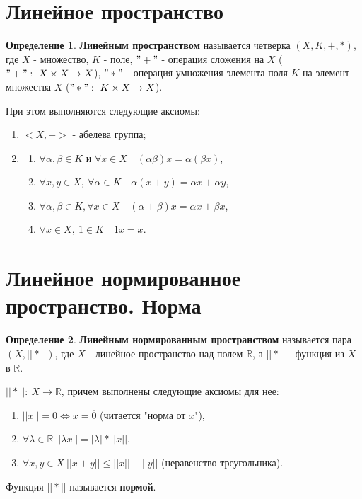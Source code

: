 \documentclass{report}
\theoremstyle{definition}
\newtheorem*{definition}{Определение}
\begin{document}
\section{Линейное пространство}

\begin{definition}
    \textbf{Линейным пространством} называется четверка $(X,K,+,*)$, где $X$ - множество, $K$ - поле, $"+"$ -
    операция сложения на $X$ ($"+": \ X \times X \rightarrow X$), $"*"$ - операция умножения элемента поля $K$
    на элемент множества $X$ ($"*": \ K \times X \rightarrow X$).

    При этом выполняются следующие аксиомы:
    \begin{enumerate}
        \item $<X,+>$ - абелева группа;
        \item
              \begin{enumerate}
                  \item $\forall \alpha,\beta \in K$ и $\forall x \in X \quad (\alpha\beta)x = \alpha(\beta x)$,
                  \item $\forall x,y \in X, \ \forall \alpha \in K \quad \alpha (x+y) = \alpha x + \alpha y$,
                  \item $\forall \alpha,\beta \in K, \forall x \in X \quad (\alpha + \beta)x = \alpha x + \beta x$,
                  \item $\forall x \in X, \ 1 \in K \quad 1x = x$.
              \end{enumerate}
    \end{enumerate}
\end{definition}

\section{Линейное нормированное пространство. Норма}

\begin{definition}
    \textbf{Линейным нормированным пространством} называется пара $(X,||*||)$, где $X$ - линейное пространство
    над полем $\mathbb{R}$, а $||*||$ - функция из $X$ в $\mathbb{R}$.

    $||*||: \ X \rightarrow \mathbb{R}$, причем выполнены следующие аксиомы для нее:
    \begin{enumerate}
        \item $||x|| = 0 \iff x = \overline{0}$ (читается "норма от $x$"),
        \item $\forall \lambda \in \mathbb{R} \ ||\lambda x|| = |\lambda| * ||x||$,
        \item $\forall x,y \in X \ ||x+y|| \leqslant ||x|| + ||y||$ (неравенство треугольника).
    \end{enumerate}
    Функция $||*||$ называется \textbf{нормой}.
\end{definition}
\end{document}

